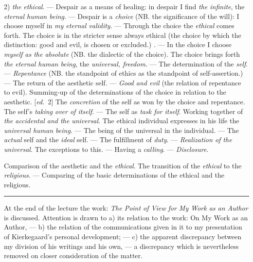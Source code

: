 \documentclass[12pt,a4paper,openany]{book}
\newcommand{\kpage}[1]{\marginnote{\footnotesize\textit{[#1]}}}
\newcommand{\ed}[1]{{\small[\textit{ed.}\ #1]}}
\newcommand{\lecture}[1]{\par\bigskip\noindent{\large #1}\par\nobreak\medskip}
\newcommand{\sepline}{\par\begin{center}\rule{2cm}{0.4pt}\end{center}\par}
\begin{document}
2) \emph{the ethical}. --- Despair as a means of healing: in despair
I find \emph{the infinite}, the \emph{eternal human being}. --- Despair is a \emph{choice}
(NB. the significance of the will): I choose myself in \emph{my eternal validity}. ---
Through the choice the \emph{ethical} comes forth. The choice is in the stricter sense
always ethical (the choice by which the distinction: good and evil, is chosen
or excluded.) . --- In the choice I choose \emph{myself as the absolute}
(NB. the dialectic of the choice). The choice brings forth \emph{the eternal human being}, the
\emph{universal, freedom}. --- The determination of the \emph{self}. --- \emph{Repentance} (NB. the standpoint
of ethics as the standpoint of self-assertion.) --- The return of the aesthetic
self. --- \emph{Good and evil} (the relation of repentance to
evil). Summing-up of the determinations of the choice in relation to the
\kpage{137}aesthetic. \ed{2} The \emph{concretion} of the self as won by the choice and repentance.
The self's \emph{taking over of itself}. --- The self as \emph{task for itself}. Working together
of \emph{the accidental and the universal}. The ethical individual expresses in his
life the \emph{universal human being}. --- The being of the universal in the individual. --- The
\emph{actual} self and the \emph{ideal} self. --- The fulfillment of \emph{duty}. --- \emph{Realization
of the universal}. The exceptions to this. --- Having a \emph{calling}. --- \emph{Disclosure}.

Comparison of the aesthetic and the \emph{ethical}. The transition of the \emph{ethical}
to the \emph{religious}. --- Comparing of the basic determinations of the ethical and the
religious.

\sepline

At the end of the lecture the work: \emph{The Point of View for My Work as an
Author} is discussed. Attention is drawn to a) its relation to
the work: On My Work as an Author, --- b) the relation of the communications
given in it to my presentation of Kierkegaard's personal
development; --- c) the apparent discrepancy between
my division of his writings and his own, --- a discrepancy
which is nevertheless removed on closer consideration of the matter.

\lecture{\ed{70.7 continued} Lecture 25}
\end{document}
